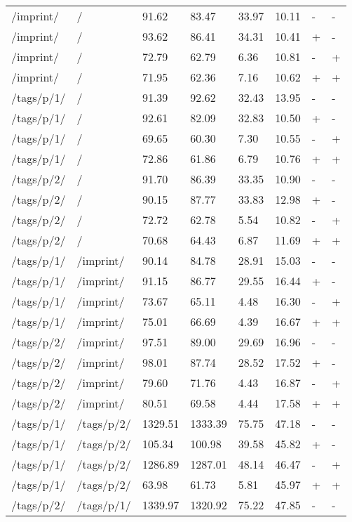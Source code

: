 \begin{appendix}
\begin{center}
\begin{longtable}{llllllll}
\hline
/imprint/ & / & 91.62 & 83.47 & 33.97 & 10.11 & - & - \\
/imprint/ & / & 93.62 & 86.41 & 34.31 & 10.41 & + & - \\
/imprint/ & / & 72.79 & 62.79 & 6.36 & 10.81 & - & + \\
/imprint/ & / & 71.95 & 62.36 & 7.16 & 10.62 & + & + \\
\hline
\hline
/tags/p/1/ & / & 91.39 & 92.62 & 32.43 & 13.95 & - & - \\
/tags/p/1/ & / & 92.61 & 82.09 & 32.83 & 10.50 & + & - \\
/tags/p/1/ & / & 69.65 & 60.30 & 7.30 & 10.55 & - & + \\
/tags/p/1/ & / & 72.86 & 61.86 & 6.79 & 10.76 & + & + \\
\hline
/tags/p/2/ & / & 91.70 & 86.39 & 33.35 & 10.90 & - & - \\
/tags/p/2/ & / & 90.15 & 87.77 & 33.83 & 12.98 & + & - \\
/tags/p/2/ & / & 72.72 & 62.78 & 5.54 & 10.82 & - & + \\
/tags/p/2/ & / & 70.68 & 64.43 & 6.87 & 11.69 & + & + \\
\hline
/tags/p/1/ & /imprint/ & 90.14 & 84.78 & 28.91 & 15.03 & - & - \\
/tags/p/1/ & /imprint/ & 91.15 & 86.77 & 29.55 & 16.44 & + & - \\
/tags/p/1/ & /imprint/ & 73.67 & 65.11 & 4.48 & 16.30 & - & + \\
/tags/p/1/ & /imprint/ & 75.01 & 66.69 & 4.39 & 16.67 & + & + \\
\hline
/tags/p/2/ & /imprint/ & 97.51 & 89.00 & 29.69 & 16.96 & - & - \\
/tags/p/2/ & /imprint/ & 98.01 & 87.74 & 28.52 & 17.52 & + & - \\
/tags/p/2/ & /imprint/ & 79.60 & 71.76 & 4.43 & 16.87 & - & + \\
/tags/p/2/ & /imprint/ & 80.51 & 69.58 & 4.44 & 17.58 & + & + \\
\hline
\hline
/tags/p/1/ & /tags/p/2/ & 1329.51 & 1333.39 & 75.75 & 47.18 & - & - \\
/tags/p/1/ & /tags/p/2/ & 105.34 & 100.98 & 39.58 & 45.82 & + & - \\
/tags/p/1/ & /tags/p/2/ & 1286.89 & 1287.01 & 48.14 & 46.47 & - & + \\
/tags/p/1/ & /tags/p/2/ & 63.98 & 61.73 & 5.81 & 45.97 & + & + \\
\hline
/tags/p/2/ & /tags/p/1/ & 1339.97 & 1320.92 & 75.22 & 47.85 & - & - \\

\end{longtable}
\end{center}
\end{appendix}

